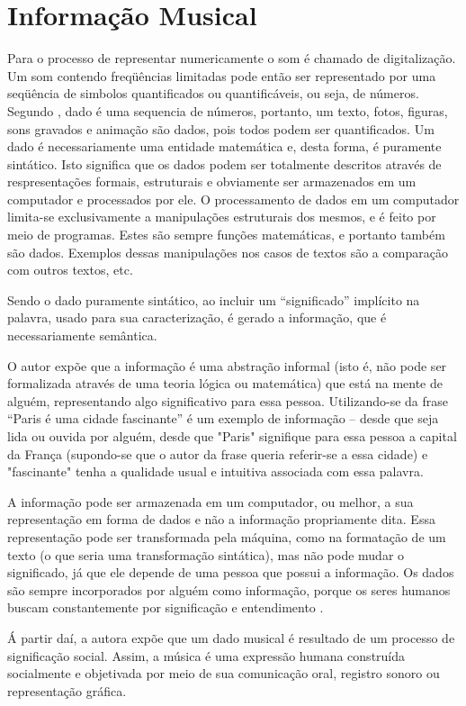 \section{Informação Musical}
Para  o processo de representar numericamente o som é chamado de digitalização. Um som contendo freqüências limitadas pode então ser representado por uma seqüência de simbolos quantificados ou quantificáveis, ou seja, de números. Segundo , dado é uma sequencia de números, portanto, um texto, fotos, figuras, sons gravados e animação são dados, pois todos podem ser quantificados. Um dado é necessariamente uma entidade matemática e, desta forma, é puramente sintático. Isto significa que os dados podem ser totalmente descritos através de respresentações formais, estruturais e obviamente ser armazenados em um computador e processados por ele. O processamento de dados em um computador limita-se exclusivamente a manipulações estruturais dos mesmos, e é feito por meio de programas. Estes são sempre funções matemáticas, e portanto também são dados. Exemplos dessas manipulações nos casos de textos são a comparação com outros textos, etc.

Sendo o dado puramente sintático, ao incluir um “significado” implícito na palavra, usado para sua caracterização, é gerado a informação, que é necessariamente semântica.

O autor expõe que a informação é uma abstração informal (isto é, não pode ser formalizada através de uma teoria lógica ou matemática) que está na mente de alguém, representando algo significativo para essa pessoa. Utilizando-se da frase “Paris é uma cidade fascinante” é um exemplo de informação – desde que seja lida ou ouvida por alguém, desde que "Paris" signifique para essa pessoa a capital da França (supondo-se que o autor da frase queria referir-se a essa cidade) e "fascinante" tenha a qualidade usual e intuitiva associada com essa palavra.

A informação pode ser armazenada em um computador, ou melhor, a sua representação em forma de dados e não a informação propriamente dita. Essa representação pode ser transformada pela máquina, como na formatação de um texto (o que seria uma transformação sintática), mas não pode mudar o significado, já que ele depende de uma pessoa que possui a informação. Os dados são sempre incorporados por alguém como informação, porque os seres humanos buscam constantemente por significação e entendimento .

Á partir daí, a autora  expõe que um dado musical é resultado de um processo de significação social. Assim, a música é uma expressão humana construída socialmente e objetivada por meio de sua comunicação oral, registro sonoro ou representação gráfica.


